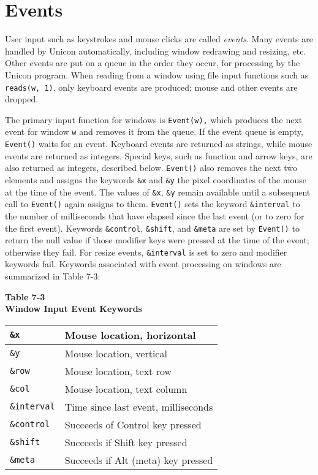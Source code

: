 \section{Events}

User input such as keystrokes and mouse clicks are called
\textit{events}. Many events are handled by Unicon automatically,
including window redrawing and resizing, etc.  Other events are put on
a queue in the order they occur, for processing by the Unicon
program. When reading from a window using file input functions such as
\texttt{reads(w, 1)}, only keyboard events are produced; mouse and
other events are dropped.

The primary input function for windows is \texttt{Event(w),} which
produces the next event for window \texttt{w} and removes it from the
queue. If the event queue is empty, \texttt{Event()} waits for an
event. Keyboard events are returned as strings, while mouse events are
returned as integers. Special keys, such as function and arrow keys,
are also returned as integers, described below. \texttt{Event()} also
removes the next two elements and assigns the keywords \texttt{\&x}
and \texttt{\&y} the pixel coordinates of the mouse at the time of the
event. The values of \texttt{\&x}, \texttt{\&y} remain available until
a subsequent call to \texttt{Event()} again assigns to them.
\texttt{Event()} sets the keyword \texttt{\&interval} to the number of
milliseconds that have elapsed since the last event (or to zero for
the first event). Keywords \texttt{\&control}, \texttt{\&shift}, and
\texttt{\&meta} are set by \texttt{Event()} to return the null value
if those modifier keys were pressed at the time of the event;
otherwise they fail. For resize events, \texttt{\&interval} is set to
zero and modifier keywords fail. Keywords associated with event
processing on windows are summarized in Table 7-3:

\begin{center}
{\sffamily\bfseries Table 7-3} \\
{\sffamily\bfseries Window Input Event Keywords}

\begin{xtabular}{|m{0.90in}|m{2.7in}|}
\texttt{\&x} &
Mouse location, horizontal\\\hline
\texttt{\&y} &
Mouse location, vertical\\\hline
\texttt{\&row} &
Mouse location, text row\\\hline
\texttt{\&col} &
Mouse location, text column\\\hline
\texttt{\&interval} &
Time since last event, milliseconds\\\hline
\texttt{\&control} &
Succeeds of Control key pressed\\\hline
\texttt{\&shift} &
Succeeds if Shift key pressed\\\hline
\texttt{\&meta} &
Succeeds if Alt (meta) key pressed\\\hline
\end{xtabular}
\end{center}

